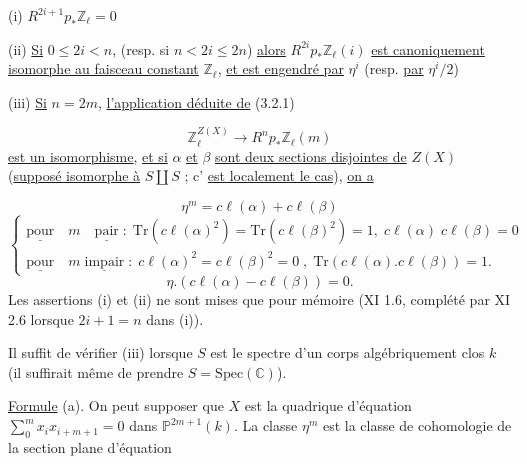 (i) \quad $R^{2i+1} p_* \mathbb{Z}_\ell = 0$ 



(ii) \underline{Si} $0 \leqslant 2i < n$, (resp. si $n< 2i \leqslant 2n$) \underline{alors} $R^{2i}p_{*} \mathbb{Z}_{\ell}(i)$ \underline{est canoniquement isomorphe au faisceau constant} $\mathbb{Z}_{\ell}$, \underline{et est engendré par} $\eta^{i}$ (resp. \underline{par} $\eta^{i}/2$)

(iii) \underline{Si} $n = 2m$, \underline{l'application déduite de} (3.2.1)

\begin{equation}\tag{3.3.1}
\mathbb{Z}_{\ell}^{Z(X)} \longrightarrow R^{n}p_{*} \mathbb{Z}_{\ell}(m)
\end{equation}
\underline{est un isomorphisme}, \underline{et si} $\alpha$ \underline{et} $\beta$ \underline{sont deux sections disjointes de} $Z(X)$ (\underline{supposé isomorphe à} $S \amalg S$ ; c' \underline{est localement le cas}), \underline{on a}

\begin{equation*}\tag{a}
\eta^{m} = c\ell(\alpha) + c\ell(\beta)
\end{equation*}
\begin{equation*}\tag{b}
\left\{ \begin{array}{l} \underline{\mathrm{pour}} \quad m \quad \underline{\mathrm{pair}} \; : \; \mathrm{Tr}(c\ell(\alpha)^{2}) = \mathrm{Tr}(c\ell(\beta)^{2}) = 1, \; c\ell(\alpha) \; c\ell(\beta) = 0 \\[2ex] \underline{\mathrm{pour}} \quad m \; \underline{\mathrm{impair}} \; : \; c\ell(\alpha)^{2} = c\ell(\beta)^{2} = 0 \; , \; \mathrm{Tr}(c\ell(\alpha).c\ell(\beta)) = 1. \end{array} \right.
\end{equation*}
\begin{equation*}\tag{c}
\eta.(c\ell(\alpha) - c\ell(\beta)) = 0.
\end{equation*}
Les assertions (i) et (ii) ne sont mises que pour mémoire (XI 1.6, complété par XI 2.6 lorsque $2i + 1 = n$ dans (i)).

Il suffit de vérifier (iii) lorsque $S$ est le spectre d'un corps algébriquement clos $k$ (il suffirait même de prendre $S = \mathrm{Spec}(\mathbb{C})$).

\underline{Formule} (a). On peut supposer que $X$ est la quadrique d'équation $\sum\limits_{0}^{m} x_{i}x_{i+m+1} = 0$ dans $\mathbb{P}^{2m+1}(k)$. La classe $\eta^{m}$ est la classe de cohomologie de la section plane d'équation

